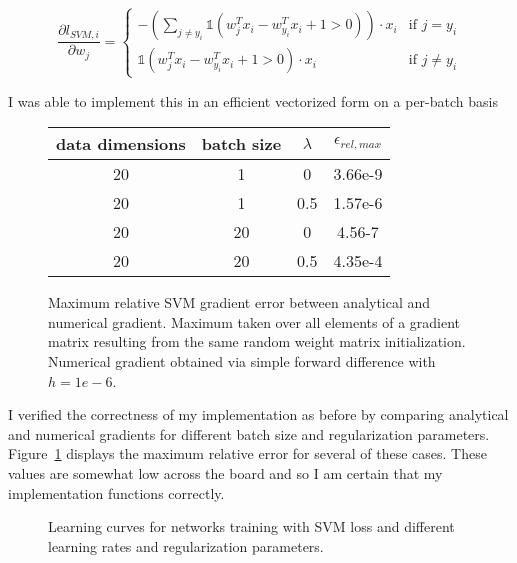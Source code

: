 \documentclass{article}
\begin{document}
$$
\frac{\partial l_{SVM, i}}{\partial w_j} =
\left\{
    \begin{array}{ll}
        -\left(
          \sum_{j \neq y_i} \mathds{1}(w_j^T x_i - w_{y_i}^T x_i + 1 > 0)
        \right)
        \cdot x_i & \mbox{if } j = y_i \\

        \mathds{1}(w_j^T x_i - w_{y_i}^T x_i + 1 > 0)
        \cdot x_i & \mbox{if } j \ne y_i
    \end{array}
\right.
$$

\noindent
I was able to implement this in an efficient vectorized form on a per-batch
basis

\bigskip

\begin{figure}
  \centering
    \begin{tabular}{|c|c|c|c|}
    \hline
    data dimensions & batch size & $\lambda$ & $\epsilon_{rel,max}$ \\
    \hline
    20              & 1          & 0         & 3.66e-9              \\
    \hline
    20              & 1          & 0.5       & 1.57e-6              \\
    \hline
    20              & 20         & 0         & 4.56-7               \\
    \hline
    20              & 20         & 0.5       & 4.35e-4              \\
    \hline
    \end{tabular}
  \caption{Maximum relative SVM gradient error between analytical and numerical
           gradient. Maximum taken over all elements of a gradient matrix
           resulting from the same random weight matrix initialization. Numerical
           gradient obtained via simple forward difference with $h = 1e-6$.}
  \label{fig:svm_gradient}
\end{figure}

\noindent
I verified the correctness of my implementation as before by comparing
analytical and numerical gradients for different batch size and regularization
parameters. Figure~\ref{fig:svm_gradient} displays the maximum relative error
for several of these cases. These values are somewhat low across the board and so
I am certain that my implementation functions correctly.

\begin{figure}
  \centering
  
  \caption{Learning curves for networks training with SVM loss and different
           learning rates and regularization parameters.}
  \label{fig:svm_learning_curves}
\end{figure}
\end{document}
